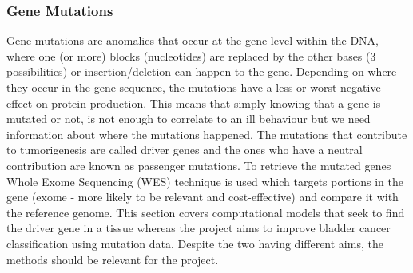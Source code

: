 \subsubsection{Gene Mutations} \label{s:lit:mutations}

\vspace{3mm}
\vspace{3mm}


Gene mutations are anomalies that occur at the gene level within the DNA, where one (or more) blocks (nucleotides) are replaced by the other bases (3 possibilities) or insertion/deletion can happen to the gene. Depending on where they occur in the gene sequence, the mutations have a less or worst negative effect on protein production. This means that simply knowing that a gene is mutated or not, is not enough to correlate to an ill behaviour but we need information about where the mutations happened. The mutations that contribute to tumorigenesis are called driver genes and the ones who have a neutral contribution are known as passenger mutations\cite{Ciriello2012-hi}. To retrieve the mutated genes Whole Exome Sequencing (WES) technique is used which targets portions in the gene (exome - more likely to be relevant and cost-effective) and compare it with the reference genome\cite{Schneider2016-ml}. This section covers computational models that seek to find the driver gene in a tissue whereas the project aims to improve bladder cancer classification using mutation data. Despite the two having different aims, the methods should be relevant for the project.

